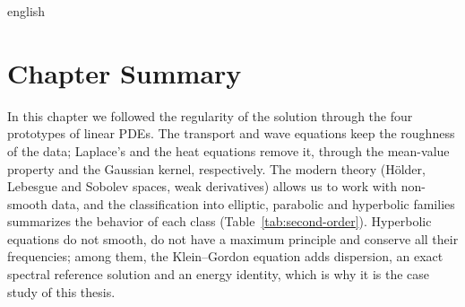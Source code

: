 \begin{hyphenrules}{english}
\section{Chapter Summary}\label{sec:ch2-summary}

In this chapter we followed the regularity of the solution through the four prototypes of linear PDEs.
The transport and wave equations keep the roughness of the data; Laplace's and the heat equations remove
it, through the mean-value property and the Gaussian kernel, respectively. The modern theory (Hölder,
Lebesgue and Sobolev spaces, weak derivatives) allows us to work with non-smooth data, and the
classification into elliptic, parabolic and hyperbolic families summarizes the behavior of each class
(Table~\ref{tab:second-order}). Hyperbolic equations do not smooth, do not have a maximum principle and
conserve all their frequencies; among them, the Klein--Gordon equation adds dispersion, an exact
spectral reference solution and an energy identity, which is why it is the case study of this thesis.

\end{hyphenrules}
